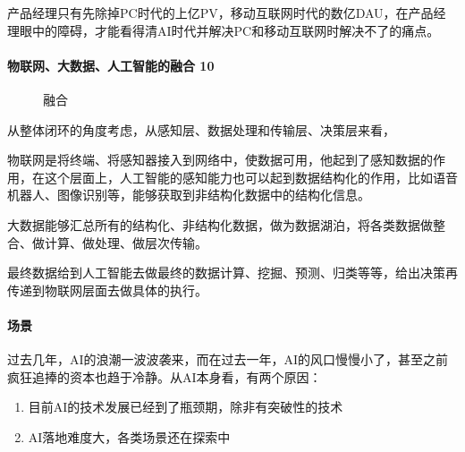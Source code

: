 \documentclass[letterpaper,11pt,english]{sphinxmanual}
\begin{document}
产品经理只有先除掉PC时代的上亿PV，移动互联网时代的数亿DAU，在产品经理眼中的障碍，才能看得清AI时代并解决PC和移动互联网时解决不了的痛点。


\paragraph{物联网、大数据、人工智能的融合 10\sphinxfootnotemark[197]}
\label{\detokenize{chapter_introduction/AI:id26}}%
\begin{footnotetext}[197]\sphinxAtStartFootnote
{}
%
\end{footnotetext}\ignorespaces 
\begin{figure}[H]
\centering
\capstart

\noindent{}
\caption{融合\sphinxfootnotemark[198]}\label{\detokenize{chapter_introduction/AI:id39}}\end{figure}
%
\begin{footnotetext}[198]\sphinxAtStartFootnote
{}
%
\end{footnotetext}\ignorespaces 
从整体闭环的角度考虑，从感知层、数据处理和传输层、决策层来看，

物联网是将终端、将感知器接入到网络中，使数据可用，他起到了感知数据的作用，在这个层面上，人工智能的感知能力也可以起到数据结构化的作用，比如语音机器人、图像识别等，能够获取到非结构化数据中的结构化信息。

大数据能够汇总所有的结构化、非结构化数据，做为数据湖泊，将各类数据做整合、做计算、做处理、做层次传输。

最终数据给到人工智能去做最终的数据计算、挖掘、预测、归类等等，给出决策再传递到物联网层面去做具体的执行。


\paragraph{场景}
\label{\detokenize{chapter_introduction/AI:id27}}
过去几年，AI的浪潮一波波袭来，而在过去一年，AI的风口慢慢小了，甚至之前疯狂追捧的资本也趋于冷静。从AI本身看，有两个原因：
%
\begin{footnote}[199]\sphinxAtStartFootnote
{}
%
\end{footnote}
\begin{enumerate}
%
\item {} 
目前AI的技术发展已经到了瓶颈期，除非有突破性的技术

\item {} 
AI落地难度大，各类场景还在探索中

\end{enumerate}
\end{document}
